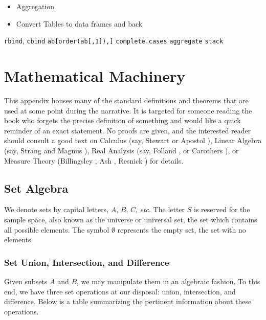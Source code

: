 \documentclass[captions=tableheading]{scrbook}
\begin{document}
\begin{itemize}
\item Aggregation
\item Convert Tables to data frames and back
\end{itemize}

\texttt{rbind}, \texttt{cbind}
\texttt{ab[order(ab[,1]),]}
\texttt{complete.cases}
\texttt{aggregate}
\texttt{stack}
\chapter{Mathematical Machinery}
\label{sec-6}

\label{cha:Mathematical-Machinery}

This appendix houses many of the standard definitions and theorems that are used at some point during the narrative. It is targeted for someone reading the book who forgets the precise definition of something and would like a quick reminder of an exact statement. No proofs are given, and the interested reader should consult a good text on Calculus (say, Stewart \cite{Stewart2008} or Apostol \cite{Apostol1967,ApostolI1967}), Linear Algebra (say, Strang \cite{Strang1988} and Magnus \cite{Magnus1999}), Real Analysis (say, Folland \cite{Folland1999}, or Carothers \cite{Carothers2000}), or Measure Theory (Billingsley \cite{Billingsley1995}, Ash \cite{Ash2000}, Resnick \cite{Resnick1999}) for details. 
\section{Set Algebra \label{sec:The-Algebra-of}}
\label{sec-6-1}


We denote sets by capital letters, $A$, $B$, $C$, \emph{etc}. The letter $S$ is reserved for the sample space, also known as the universe or universal set, the set which contains all possible elements. The symbol $\emptyset$ represents the empty set, the set with no elements. 
\subsection{Set Union, Intersection, and Difference}
\label{sec-6-1-1}


Given subsets $A$ and $B$, we may manipulate them in an algebraic fashion. To this end, we have three set operations at our disposal: union, intersection, and difference. Below is a table summarizing the pertinent information about these operations.
\end{document}
